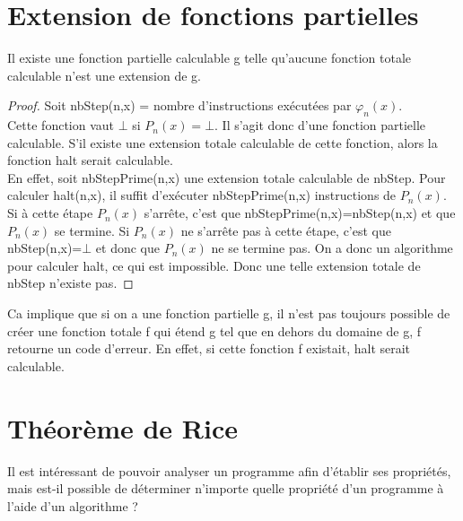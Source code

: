 
\section{Extension de fonctions partielles}
\label{sec:extension_de_fonctions_partielles}

\begin{mytheo}
	Il existe une fonction partielle calculable g telle qu'aucune fonction totale calculable n'est une extension de g.
  \begin{proof}
    Soit nbStep(n,x)  = nombre d'instructions exécutées par $\varphi_n(x)$.\\
    Cette fonction vaut $\bot$ si $P_n(x) = \bot$. Il s'agit donc d'une fonction partielle calculable. S'il existe une extension totale calculable de cette fonction, alors la fonction halt serait calculable.\\
    En effet, soit nbStepPrime(n,x) une extension totale calculable de nbStep. Pour calculer halt(n,x), il suffit d'exécuter nbStepPrime(n,x) instructions de $P_n(x)$.  Si à cette étape $P_n(x)$ s'arrête, c'est que nbStepPrime(n,x)=nbStep(n,x) et que $P_n(x)$ se termine.  Si $P_n(x)$ ne s'arrête pas à cette étape, c'est que nbStep(n,x)=$\bot$ et donc que $P_n(x)$ ne se termine pas. On a donc un algorithme pour calculer halt, ce qui est impossible.  Donc une telle extension totale de nbStep n'existe pas.
  \end{proof}
\end{mytheo}

\begin{myrem}
	Ca implique que si on a une fonction partielle g, il n'est pas
	toujours possible de créer une fonction totale f qui étend g
	tel que en dehors du domaine de g, f retourne un code d'erreur.  En effet, si cette fonction f existait, halt serait calculable.
\end{myrem}


\section{Théorème de Rice}
\label{sub:theoreme_de_rice}

Il est intéressant de pouvoir analyser un programme afin d'établir ses propriétés, mais est-il possible de déterminer n'importe quelle propriété d'un programme à l'aide d'un algorithme ?

